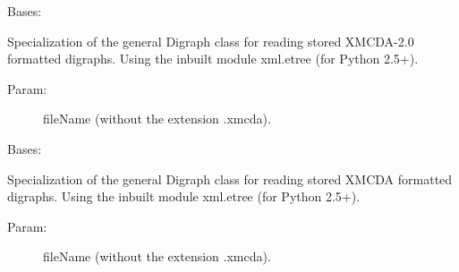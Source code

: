 \documentclass[letterpaper,10pt,english]{sphinxmanual}
\begin{document}
\begin{fulllineitems}
\label{techDoc:digraphs.XMCDA2Digraph}
Bases: {\hyperref[techDoc:digraphs.Digraph]{}}

Specialization of the general Digraph class for reading
stored XMCDA-2.0 formatted digraphs. Using the inbuilt module
xml.etree (for Python 2.5+).
\begin{description}
\item[{Param:}] \leavevmode
fileName (without the extension .xmcda).

\end{description}

\begin{fulllineitems}
\label{techDoc:digraphs.XMCDA2Digraph.showAll}
\end{fulllineitems}


\end{fulllineitems}


\begin{fulllineitems}
\label{techDoc:digraphs.XMCDADigraph}
Bases: {\hyperref[techDoc:digraphs.Digraph]{}}

Specialization of the general Digraph class for reading
stored XMCDA formatted digraphs. Using the inbuilt module
xml.etree (for Python 2.5+).
\begin{description}
\item[{Param:}] \leavevmode
fileName (without the extension .xmcda).

\end{description}

\begin{fulllineitems}
\label{techDoc:digraphs.XMCDADigraph.showAll}
\end{fulllineitems}


\end{fulllineitems}

\end{document}
